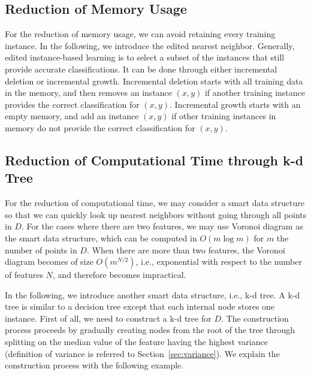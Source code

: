 

\subsection*{Reduction of Memory Usage}


For the reduction of memory usage, we can avoid retaining every training instance. In the following, we introduce the edited nearest neighbor. Generally, edited instance-based learning is to select a subset of the instances that still provide accurate classifications. It can be done through either incremental deletion or incremental growth. Incremental deletion starts with all training data in the memory, and then removes an instance $(x,y)$ if another training instance provides the correct classification for $(x,y)$. Incremental growth starts with an empty memory, and add an instance $(x,y)$ if other training instances in memory do not provide the correct classification for $(x,y)$. 

\subsection*{Reduction of Computational Time through k-d Tree}

For the reduction of computational time, we may consider a smart data structure so that we can quickly look up nearest neighbors without going through all points in $D$. 
%
%
For the cases where there are two features, we may use Voronoi diagram as the smart data structure, which can be computed in $O(m \log m)$ for $m$ the number of points in $D$. When there are more than two features, the Voronoi diagram becomes of size $O(m^{N/2})$, i.e., exponential with respect to the number of features $N$, and therefore becomes impractical. 

In the following, we introduce another smart data structure, i.e., k-d tree. A k-d tree is similar to a decision tree except that each internal node 
stores one instance. 
%
First of all, we need to construct a k-d tree for $D$. The construction process proceeds by gradually creating nodes from the root of the tree through 
splitting on the median value of the feature having the highest variance (definition of variance is referred to Section~\ref{sec:variance}). We explain the construction process with the following example. 

